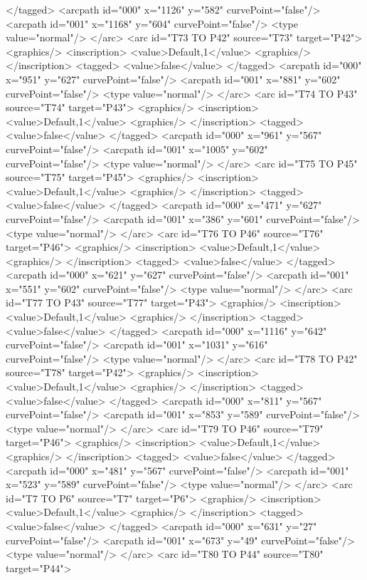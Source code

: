 </tagged>
<arcpath id="000" x="1126" y="582" curvePoint="false"/>
<arcpath id="001" x="1168" y="604" curvePoint="false"/>
<type value="normal"/>
</arc>
<arc id="T73 TO P42" source="T73" target="P42">
<graphics/>
<inscription>
<value>Default,1</value>
<graphics/>
</inscription>
<tagged>
<value>false</value>
</tagged>
<arcpath id="000" x="951" y="627" curvePoint="false"/>
<arcpath id="001" x="881" y="602" curvePoint="false"/>
<type value="normal"/>
</arc>
<arc id="T74 TO P43" source="T74" target="P43">
<graphics/>
<inscription>
<value>Default,1</value>
<graphics/>
</inscription>
<tagged>
<value>false</value>
</tagged>
<arcpath id="000" x="961" y="567" curvePoint="false"/>
<arcpath id="001" x="1005" y="602" curvePoint="false"/>
<type value="normal"/>
</arc>
<arc id="T75 TO P45" source="T75" target="P45">
<graphics/>
<inscription>
<value>Default,1</value>
<graphics/>
</inscription>
<tagged>
<value>false</value>
</tagged>
<arcpath id="000" x="471" y="627" curvePoint="false"/>
<arcpath id="001" x="386" y="601" curvePoint="false"/>
<type value="normal"/>
</arc>
<arc id="T76 TO P46" source="T76" target="P46">
<graphics/>
<inscription>
<value>Default,1</value>
<graphics/>
</inscription>
<tagged>
<value>false</value>
</tagged>
<arcpath id="000" x="621" y="627" curvePoint="false"/>
<arcpath id="001" x="551" y="602" curvePoint="false"/>
<type value="normal"/>
</arc>
<arc id="T77 TO P43" source="T77" target="P43">
<graphics/>
<inscription>
<value>Default,1</value>
<graphics/>
</inscription>
<tagged>
<value>false</value>
</tagged>
<arcpath id="000" x="1116" y="642" curvePoint="false"/>
<arcpath id="001" x="1031" y="616" curvePoint="false"/>
<type value="normal"/>
</arc>
<arc id="T78 TO P42" source="T78" target="P42">
<graphics/>
<inscription>
<value>Default,1</value>
<graphics/>
</inscription>
<tagged>
<value>false</value>
</tagged>
<arcpath id="000" x="811" y="567" curvePoint="false"/>
<arcpath id="001" x="853" y="589" curvePoint="false"/>
<type value="normal"/>
</arc>
<arc id="T79 TO P46" source="T79" target="P46">
<graphics/>
<inscription>
<value>Default,1</value>
<graphics/>
</inscription>
<tagged>
<value>false</value>
</tagged>
<arcpath id="000" x="481" y="567" curvePoint="false"/>
<arcpath id="001" x="523" y="589" curvePoint="false"/>
<type value="normal"/>
</arc>
<arc id="T7 TO P6" source="T7" target="P6">
<graphics/>
<inscription>
<value>Default,1</value>
<graphics/>
</inscription>
<tagged>
<value>false</value>
</tagged>
<arcpath id="000" x="631" y="27" curvePoint="false"/>
<arcpath id="001" x="673" y="49" curvePoint="false"/>
<type value="normal"/>
</arc>
<arc id="T80 TO P44" source="T80" target="P44">
